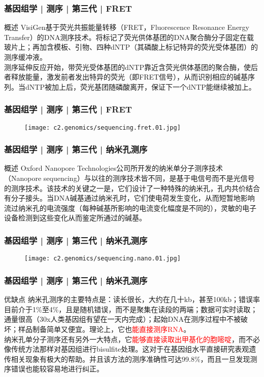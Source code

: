 \begin{frame}
  \frametitle{基因组学 | 测序 | 第三代 | FRET}
  \begin{block}{概述}
VisiGen基于荧光共振能量转移（FRET，Fluorescence Resonance Energy Transfer）的DNA测序技术。将标记了荧光供体基团的DNA聚合酶分子固定在载玻片上；再加含模板、引物、四种dNTP（其磷酸上标记特异的荧光受体基团）的测序缓冲液。\\
\vspace{1em}
测序延伸反应开始，带荧光受体基团的dNTP靠近含荧光供体基团的聚合酶，使后者释放能量，激发前者发出特异的荧光（即FRET信号），从而识别相应的碱基序列。当dNTP被加上后，荧光基团随磷酸离开，保证下一个dNTP能继续被加上。
  \end{block}
\end{frame}

\begin{frame}
  \frametitle{基因组学 | 测序 | 第三代 | FRET}
  \begin{figure}
    \centering
    \texttt{[image: c2.genomics/sequencing.fret.01.jpg]}
  \end{figure}
\end{frame}

\begin{frame}
  \frametitle{基因组学 | 测序 | 第三代 | 纳米孔测序}
  \begin{block}{概述}
Oxford Nanopore Technologies公司所开发的纳米单分子测序技术（Nanopore sequencing）与以往的测序技术皆不同，是基于电信号而不是光信号的测序技术。该技术的关键之一是，它们设计了一种特殊的纳米孔，孔内共价结合有分子接头。当DNA碱基通过纳米孔时，它们使电荷发生变化，从而短暂地影响流过纳米孔的电流强度（每种碱基所影响的电流变化幅度是不同的），灵敏的电子设备检测到这些变化从而鉴定所通过的碱基。
  \end{block}
\end{frame}

\begin{frame}
  \frametitle{基因组学 | 测序 | 第三代 | 纳米孔测序}
  \begin{figure}
    \centering
    \texttt{[image: c2.genomics/sequencing.nano.01.jpg]}
  \end{figure}
\end{frame}

\begin{frame}
  \frametitle{基因组学 | 测序 | 第三代 | 纳米孔测序}
  \begin{block}{优缺点}
纳米孔测序的主要特点是：读长很长，大约在几十kb，甚至100kb；错误率目前介于1\%至4\%，且是随机错误，而不是聚集在读段的两端；数据可实时读取；通量很高（30x人类基因组有望在一天内完成）；起始DNA在测序过程中不被破坏；样品制备简单又便宜。理论上，它也\textcolor{red}{能直接测序RNA}。\\
\vspace{1em}
纳米孔单分子测序还有另外一大特点，它\textcolor{red}{能够直接读取出甲基化的胞嘧啶}，而不必像传统方法那样对基因组进行bisulfite处理。这对于在基因组水平直接研究表观遗传相关现象有极大的帮助。并且该方法的测序准确性可达99.8\%，而且一旦发现测序错误也能较容易地进行纠正。
  \end{block}
\end{frame}

